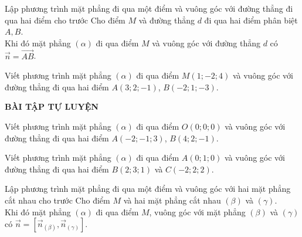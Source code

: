\begin{dang}{Lập phương trình mặt phẳng đi qua một điểm và vuông góc với đường thẳng đi qua hai điểm cho trước}
    Cho điểm $M$ và đường thẳng $d$ đi qua hai điểm phân biệt $A,B$.\\
    Khi đó mặt phẳng $(\alpha)$ đi qua điểm $M$ và vuông góc với đường thẳng $d$ có $\overrightarrow{n}=\overrightarrow{AB}$.
\end{dang}

\begin{vd}%
Viết phương trình mặt phẳng $(\alpha)$ đi qua điểm $M\left(1;-2;4\right)$ và vuông góc với đường thẳng đi qua hai điểm $A\left(3;2;-1\right)$, $B\left(-2;1;-3\right)$.
\end{vd}

\begin{center}
    \textbf{BÀI TẬP TỰ LUYỆN}
\end{center}
\begin{bt}%
 Viết phương trình mặt phẳng $(\alpha)$ đi qua điểm $O\left(0;0;0\right)$ và vuông góc với đường thẳng đi qua hai điểm $A\left(-2;-1;3\right)$, $B\left(4;2;-1\right)$. 
\end{bt}

\begin{bt}%
    Viết phương trình mặt phẳng $\left(\alpha\right)$ đi qua điểm $A\left(0;1;0\right)$ và vuông góc với đường thẳng đi qua hai điểm $B\left(2;3;1\right)$ và $C\left(-2;2;2\right)$.
\end{bt}

\begin{dang}{Lập phương trình mặt phẳng đi qua một điểm và vuông góc với hai mặt phẳng cắt nhau cho trước}
    Cho điểm $M$ và hai mặt phẳng cắt nhau $(\beta)$ và $(\gamma)$.\\
    Khi đó mặt phẳng $(\alpha)$ đi qua điểm $M$, vuông góc với mặt phẳng $(\beta)$ và $(\gamma)$ có $\overrightarrow{n}=\left[\overrightarrow{n}_{(\beta)},\overrightarrow{n}_{(\gamma)}\right]$.
\end{dang}

